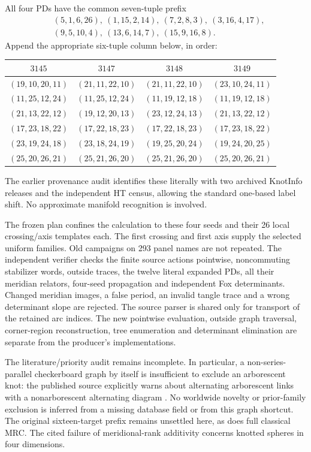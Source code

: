 \documentclass[11pt]{article}
\begin{document}
All four PDs have the common seven-tuple prefix
\begin{align*}
 &(5,1,6,26),\ (1,15,2,14),\ (7,2,8,3),\ (3,16,4,17),\\
 &(9,5,10,4),\ (13,6,14,7),\ (15,9,16,8).
\end{align*}
Append the appropriate six-tuple column below, in order:
\begin{center}\small
\begin{tabular}{cccc}
\toprule
$3145$&$3147$&$3148$&$3149$\\\midrule
$(19,10,20,11)$&$(21,11,22,10)$&$(21,11,22,10)$&$(23,10,24,11)$\\
$(11,25,12,24)$&$(11,25,12,24)$&$(11,19,12,18)$&$(11,19,12,18)$\\
$(21,13,22,12)$&$(19,12,20,13)$&$(23,12,24,13)$&$(21,13,22,12)$\\
$(17,23,18,22)$&$(17,22,18,23)$&$(17,22,18,23)$&$(17,23,18,22)$\\
$(23,19,24,18)$&$(23,18,24,19)$&$(19,25,20,24)$&$(19,24,20,25)$\\
$(25,20,26,21)$&$(25,21,26,20)$&$(25,21,26,20)$&$(25,20,26,21)$\\
\bottomrule
\end{tabular}
\end{center}
The earlier provenance audit identifies these literally
with two archived KnotInfo releases and the independent
HT census, allowing the standard one-based label shift.
No approximate manifold recognition is involved.

The frozen plan confines the calculation to these four
seeds and their 26 local crossing/axis templates each.
The first crossing and first axis supply the selected
uniform families. Old campaigns on 293 panel names are
not repeated. The independent verifier checks the finite
source actions pointwise, noncommuting stabilizer words,
outside traces, the twelve literal expanded PDs, all their
meridian relators, four-seed propagation and independent
Fox determinants. Changed meridian images, a false period,
an invalid tangle trace and a wrong determinant slope are
rejected. The source parser is shared only for transport
of the retained arc indices. The new pointwise evaluation,
outside graph traversal, corner-region reconstruction,
tree enumeration and determinant elimination are separate
from the producer's implementations.

The literature/priority audit remains incomplete. In
particular, a non-series-parallel checkerboard graph by
itself is insufficient to exclude an arborescent knot:
the published source explicitly warns about alternating
arborescent links with a nonarborescent alternating diagram
\cite[Proposition 6.3 and Remark 6.4]{stoim}.
No worldwide novelty or prior-family exclusion is inferred
from a missing database field or from this graph shortcut.
The original sixteen-target prefix remains unsettled here,
as does full classical MRC. The cited failure of meridional-rank
additivity concerns knotted spheres in four dimensions.
\end{document}
